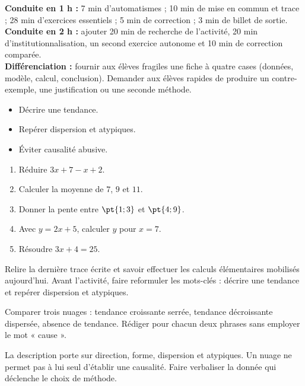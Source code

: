 \ifmxteacher
\begin{method}
\textbf{Conduite en 1 h :} 7 min d'automatismes ; 10 min de mise en commun et trace ; 28 min d'exercices essentiels ; 5 min de correction ; 3 min de billet de sortie.\\
\textbf{Conduite en 2 h :} ajouter 20 min de recherche de l'activité, 20 min d'institutionnalisation, un second exercice autonome et 10 min de correction comparée.\\
\textbf{Différenciation :} fournir aux élèves fragiles une fiche à quatre cases (données, modèle, calcul, conclusion). Demander aux élèves rapides de produire un contre-exemple, une justification ou une seconde méthode.
\end{method}
\fi
{}
\begin{objectives}\begin{itemize}\item Décrire une tendance.\item Repérer dispersion et atypiques.\item Éviter causalité abusive.\end{itemize}\end{objectives}
\begin{fluency}\begin{enumerate}\item Réduire $3x+7-x+2$. \item Calculer la moyenne de $7$, $9$ et $11$. \item Donner la pente entre $\pt{1;3}$ et $\pt{4;9}$. \item Avec $y=2x+5$, calculer $y$ pour $x=7$. \item Résoudre $3x+4=25$. \end{enumerate}\end{fluency}
\begin{prerequisites}Relire la dernière trace écrite et savoir effectuer les calculs élémentaires mobilisés aujourd'hui. Avant l'activité, faire reformuler les mots-clés : décrire une tendance et repérer dispersion et atypiques.\end{prerequisites}

\begin{activity}
Comparer trois nuages : tendance croissante serrée, tendance décroissante dispersée, absence de tendance. Rédiger pour chacun deux phrases sans employer le mot « cause ».

\end{activity}
\begin{solution}La description porte sur direction, forme, dispersion et atypiques. Un nuage ne permet pas à lui seul d'établir une causalité. Faire verbaliser la donnée qui déclenche le choix de méthode.\end{solution}

